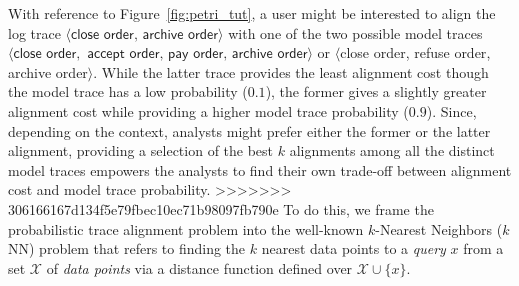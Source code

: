 With reference to Figure~\ref{fig:petri_tut}, a user might be interested to align the log trace $\langle \textsf{close order},\,\textsf{archive order}\rangle$ with one of the two possible model traces $\langle\textsf{close order},$ $\textsf{accept order},\,\textsf{pay order},\,\textsf{archive order}\rangle$ or $\langle$\textsf{close order}, \textsf{refuse order}, \textsf{archive order}$\rangle$. While the latter trace provides the least alignment cost though the model trace has a low probability ($0.1$), the former gives a slightly greater alignment cost while providing a higher model trace probability ($0.9$). Since, depending on the context, analysts might prefer either the former or the latter alignment, providing a selection of the best $k$ alignments among all the distinct model traces empowers the analysts to find their own trade-off between alignment cost and model trace probability.
>>>>>>> 306166167d134f5e79fbec10ec71b98097fb790e
To do this, we frame the probabilistic trace alignment problem into the well-known $k$-Nearest Neighbors ($k$NN) problem \cite{Altman} that refers to finding the $k$ nearest data points to a \textit{query} $x$ from a set $\mathcal{X}$ of \textit{data points} via a distance function defined over $\mathcal{X}\cup\{x\}$.
